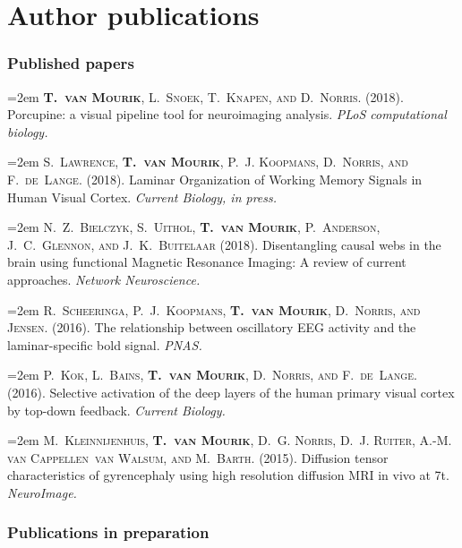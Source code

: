 \chapter[Author publications]{Author publications}
\label{chap:publications}


\subsection{Published papers}


\hangindent=2em
\noindent
\textsc{\textbf{T.~van Mourik}, L.~Snoek, T.~Knapen, and D.~Norris.} 
(2018).
Porcupine: a visual pipeline tool for neuroimaging analysis.
\emph{PLoS computational biology.}


\hangindent=2em
\noindent
\textsc{S.~Lawrence, \textbf{T.~van Mourik}, P.~J. Koopmans, D.~Norris, and F.~de~Lange.} 
(2018).
Laminar Organization of Working Memory Signals in Human Visual Cortex. 
\emph{Current Biology, in press.}


\hangindent=2em
\noindent
\textsc{N.~Z.~Bielczyk, S.~Uithol, \textbf{T.~van Mourik}, P.~Anderson, J.~C.~Glennon, and J.~K.~Buitelaar} 
(2018).
Disentangling causal webs in the brain using functional Magnetic Resonance Imaging: A review of current approaches.
\emph{Network Neuroscience.}


\hangindent=2em
\noindent
\textsc{R.~Scheeringa, P.~J.~Koopmans, \textbf{T.~van Mourik}, D.~Norris, and Jensen.} 
(2016).
The relationship between oscillatory {EEG} activity and the laminar-specific bold signal.
\emph{PNAS.}


\hangindent=2em
\noindent
\textsc{P.~Kok, L.~Bains, \textbf{T.~van Mourik}, D.~Norris, and F.~de~Lange.} 
(2016).
Selective activation of the deep layers of the human primary visual	cortex by top-down feedback.
\emph{Current Biology.}


\hangindent=2em
\noindent
\textsc{M.~Kleinnijenhuis, \textbf{T.~van Mourik}, D.~G. Norris, D.~J. Ruiter, A.-M. van	Cappellen~van Walsum, and M.~Barth.} 
(2015).
Diffusion tensor characteristics of gyrencephaly using high	resolution diffusion {MRI} in vivo at 7t.
\emph{NeuroImage.}



\subsection{Publications in preparation}
	

